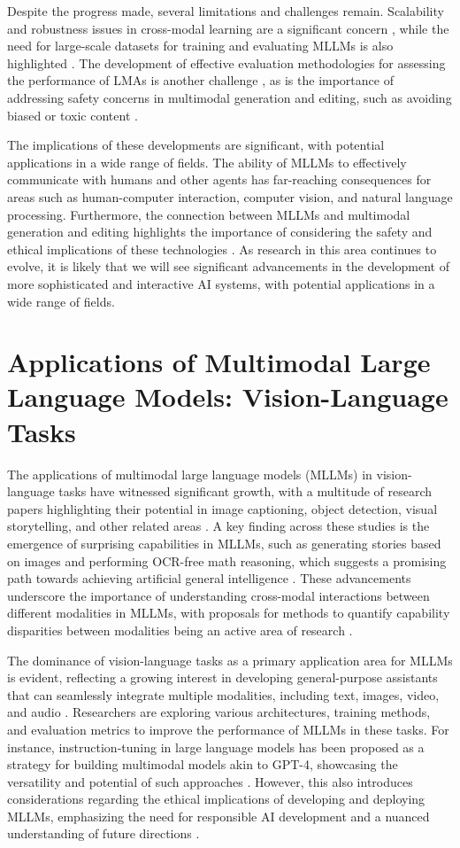 \documentclass[conference]{IEEEtran}
\begin{document}
Despite the progress made, several limitations and challenges remain. Scalability and robustness issues in cross-modal learning are a significant concern \cite{b3}, while the need for large-scale datasets for training and evaluating MLLMs is also highlighted \cite{b1}. The development of effective evaluation methodologies for assessing the performance of LMAs is another challenge \cite{b2}, as is the importance of addressing safety concerns in multimodal generation and editing, such as avoiding biased or toxic content \cite{b6}.

The implications of these developments are significant, with potential applications in a wide range of fields. The ability of MLLMs to effectively communicate with humans and other agents has far-reaching consequences for areas such as human-computer interaction, computer vision, and natural language processing. Furthermore, the connection between MLLMs and multimodal generation and editing highlights the importance of considering the safety and ethical implications of these technologies \cite{b6}. As research in this area continues to evolve, it is likely that we will see significant advancements in the development of more sophisticated and interactive AI systems, with potential applications in a wide range of fields.

\section{Applications of Multimodal Large Language Models: Vision-Language Tasks}
The applications of multimodal large language models (MLLMs) in vision-language tasks have witnessed significant growth, with a multitude of research papers highlighting their potential in image captioning, object detection, visual storytelling, and other related areas \cite{b1}. A key finding across these studies is the emergence of surprising capabilities in MLLMs, such as generating stories based on images and performing OCR-free math reasoning, which suggests a promising path towards achieving artificial general intelligence \cite{b2}. These advancements underscore the importance of understanding cross-modal interactions between different modalities in MLLMs, with proposals for methods to quantify capability disparities between modalities being an active area of research \cite{b3}.

The dominance of vision-language tasks as a primary application area for MLLMs is evident, reflecting a growing interest in developing general-purpose assistants that can seamlessly integrate multiple modalities, including text, images, video, and audio \cite{b4}. Researchers are exploring various architectures, training methods, and evaluation metrics to improve the performance of MLLMs in these tasks. For instance, instruction-tuning in large language models has been proposed as a strategy for building multimodal models akin to GPT-4, showcasing the versatility and potential of such approaches \cite{b5}. However, this also introduces considerations regarding the ethical implications of developing and deploying MLLMs, emphasizing the need for responsible AI development and a nuanced understanding of future directions \cite{b6}.
\end{document}
